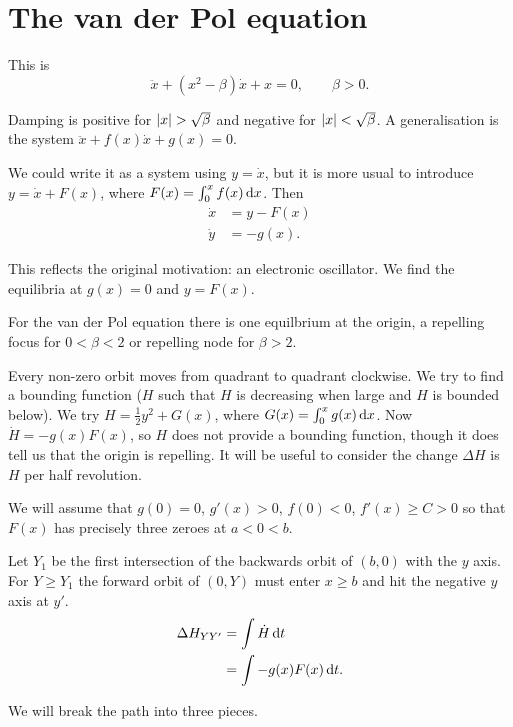 \documentclass{notes}
\theoremstyle{plain}
\begin{document}
\section{The van der Pol equation}

This is
\[
\ddot{x} + (x^2 - \beta)\dot{x} + x = 0, \qquad \beta > 0.
\]

Damping is positive for $\left|x\right| > \sqrt{\beta}$ and negative for
$\left|x\right| < \sqrt{\beta}$.  A generalisation is the system
$\ddot{x} + f(x)\dot{x} + g(x)=0$.

We could write it as a system using $y = \dot{x}$, but it is more usual
to introduce $y = \dot{x} + F(x)$, where $F(x) = \int_0^x f(x)\,\mathrm{d} x$.
Then
\begin{align*}
\dot{x} &= y - F(x) \\
\dot{y} &= -g(x).
\end{align*}

This reflects the original motivation: an electronic oscillator.  We find
the equilibria at $g(x) = 0$ and $y = F(x)$.

For the van der Pol equation there is one equilbrium at the origin,
a repelling focus  for $0 < \beta < 2$ or repelling node for $\beta > 2$.

\vspace{3in}

Every non-zero orbit moves from quadrant to quadrant clockwise.  We
try to find a bounding function ($H$ such that $H$ is decreasing when large
and $H$ is bounded below). We try $H = \frac{1}{2} y^2 + G(x)$, where
$G(x) = \int_0^x g(x)\,\mathrm{d} x$.  Now $\dot{H} = -g(x) F(x)$, so $H$ does
not provide a bounding function, though it does tell us that the origin is
repelling.  It will be useful to consider the change $\Delta H$ is $H$
per half revolution.

We will assume that $g(0)=0$, $g'(x) > 0$, $f(0) < 0$, $f'(x) \ge C >  0$
so that $F(x)$ has precisely three zeroes at $a < 0 < b$.

\vspace{2in}

Let $Y_1$ be the first intersection of the backwards orbit of $(b,0)$ with
the $y$ axis.  For $Y \ge Y_1$ the forward orbit of $(0,Y)$ must enter
$x \ge b$ and hit the negative $y$ axis at $y'$.
\begin{align*}
\Delta H_{Y Y'} &= \int \dot{H}\,\mathrm{d} t \\
&= \int - g(x) F(x)\,\mathrm{d} t.
\end{align*}

We will break the path into three pieces.
\end{document}
